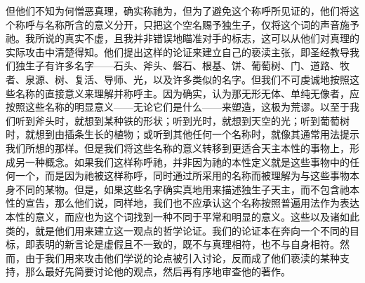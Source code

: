 但他们不知为何憎恶真理，确实称祂为，但为了避免这个称呼所见证的，他们将这个称呼与名称所含的意义分开，只把这个空名赐予独生子，仅将这个词的声音施予祂。我所说的真实不虚，且我并非错误地瞄准对手的标志，这可以从他们对真理的实际攻击中清楚得知。他们提出这样的论证来建立自己的亵渎主张，即圣经教导我们独生子有许多名字——石头、斧头、磐石、根基、饼、葡萄树、门、道路、牧者、泉源、树、复活、导师、光，以及许多类似的名字。但我们不可虔诚地按照这些名称的直接意义来理解并称呼主。因为确实，认为那无形无体、单纯无像者，应按照这些名称的明显意义——无论它们是什么——来塑造，这极为荒谬。以至于我们听到斧头时，就想到某种铁的形状；听到光时，就想到天空的光；听到葡萄树时，就想到由插条生长的植物；或听到其他任何一个名称时，就像其通常用法提示我们所想的那样。但是我们将这些名称的意义转移到更适合天主本性的事物上，形成另一种概念。如果我们这样称呼祂，并非因为祂的本性定义就是这些事物中的任何一个，而是因为祂被这样称呼，同时通过所采用的名称而被理解为与这些事物本身不同的某物。但是，如果这些名字确实真地用来描述独生子天主，而不包含祂本性的宣告，那么他们说，同样地，我们也不应承认这个名称按照普遍用法作为表达本性的意义，而应也为这个词找到一种不同于平常和明显的意义。这些以及诸如此类的，就是他们用来建立这一观点的哲学论证。我们的论证本在奔向一个不同的目标，即表明的新言论是虚假且不一致的，既不与真理相符，也不与自身相符。然而，由于我们用来攻击他们学说的论点被引入讨论，反而成了他们亵渎的某种支持，那么最好先简要讨论他的观点，然后再有序地审查他的著作。\par

